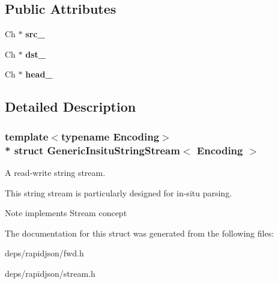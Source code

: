 \subsection*{Public Attributes}
\begin{DoxyCompactItemize}
\item 
Ch $\ast$ {\bfseries src\+\_\+}\hypertarget{struct_generic_insitu_string_stream_a35ce3e496639c8a616d85b1736b1f407}{}\label{struct_generic_insitu_string_stream_a35ce3e496639c8a616d85b1736b1f407}

\item 
Ch $\ast$ {\bfseries dst\+\_\+}\hypertarget{struct_generic_insitu_string_stream_a3e6582dc802fefd92b05c7bcc50c7fc1}{}\label{struct_generic_insitu_string_stream_a3e6582dc802fefd92b05c7bcc50c7fc1}

\item 
Ch $\ast$ {\bfseries head\+\_\+}\hypertarget{struct_generic_insitu_string_stream_a314209f1537cacf732848f6a7719a1d8}{}\label{struct_generic_insitu_string_stream_a314209f1537cacf732848f6a7719a1d8}

\end{DoxyCompactItemize}


\subsection{Detailed Description}
\subsubsection*{template$<$typename Encoding$>$\\*
struct Generic\+Insitu\+String\+Stream$<$ Encoding $>$}

A read-\/write string stream. 

This string stream is particularly designed for in-\/situ parsing. \begin{DoxyNote}{Note}
implements Stream concept 
\end{DoxyNote}


The documentation for this struct was generated from the following files\+:\begin{DoxyCompactItemize}
\item 
deps/rapidjson/fwd.\+h\item 
deps/rapidjson/stream.\+h\end{DoxyCompactItemize}

